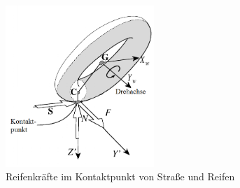 \begin{figure}[h!tb]
\begin{center}
\includegraphics[width=0.5\textwidth]{abbildungen/05_reifenkraefte.png}
\caption{Reifenkr\"afte im Kontaktpunkt von Stra\ss{}e und Reifen \cite[S. 6]{Cossalter2002}}
\label{fig:modell_reifenF}
\end{center}
\end{figure}

